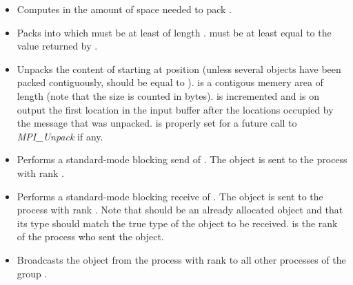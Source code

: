 \begin{itemize}
\item {}
  \sshortdescribe Computes in  the amount of space needed to pack .
\item {}
  \sshortdescribe Packs  into  which must be at least of
  length .  must be at least equal to the value returned
  by . 
\item {}
  \sshortdescribe Unpacks the content of  starting at position
   (unless several objects have been packed contiguously,  should be equal to ).  is a contigous memery area
  of length  (note that the size is counted in bytes).
   is incremented and is on output the first location in the input
  buffer after the locations occupied by the message that was
  unpacked.  is properly set for a future call to {\it MPI_Unpack}
  if any.
  
\item {}
  \sshortdescribe Performs a standard-mode blocking send of . The
  object is sent to the process with rank .
  
\item {} 
  \sshortdescribe Performs a standard-mode blocking receive of . The
  object is sent to the process with rank . Note that 
  should be an already allocated object and that its type should match the
  true type of the object to be received.  is the rank of the
  process who sent the object.

  
\item {}
  \sshortdescribe Broadcasts the object  from the process with rank
   to all other processes of the group .
\end{itemize}

